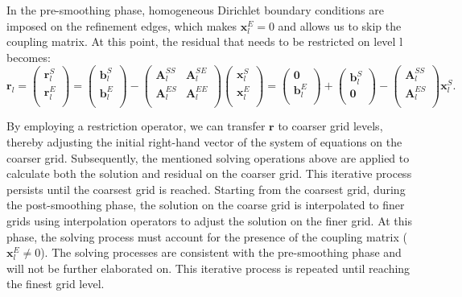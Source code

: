 \documentclass[extra, referee]{gji}
\begin{document}
In the pre-smoothing phase, homogeneous Dirichlet boundary conditions
\citep{BeirodaVeiga2013} are imposed on the refinement edges, which makes
$\mathbf{x}^E_l=0$ and allows us to skip the coupling matrix. At this point, the
residual that needs to be restricted on level l becomes:
\begin{equation}
  \label{eq:ten}
  \mathbf{r}_l=
  \begin{pmatrix}
    \mathbf{r}^S_l\\
    \mathbf{r}^E_l\\
  \end{pmatrix}
  =
  \begin{pmatrix}
    \mathbf{b}^S_l\\
    \mathbf{b}^E_l\\
  \end{pmatrix}
  -
  \begin{pmatrix}
    \mathbf{A}^{SS}_l & \mathbf{A}^{SE}_l\\
    \mathbf{A}^{ES}_l & \mathbf{A}^{EE}_l\\
  \end{pmatrix}
  \begin{pmatrix}
    \mathbf{x}^S_l\\
    \mathbf{x}^E_l\\
  \end{pmatrix}
  =
  \begin{pmatrix}
    \mathbf{0}\\
    \mathbf{b}^E_l\\
  \end{pmatrix}
  +\begin{pmatrix}
    \mathbf{b}^S_l\\
    \mathbf{0}\\
  \end{pmatrix}
  -
  \begin{pmatrix}
    \mathbf{A}^{SS}_l\\
    \mathbf{A}^{ES}_l\\
  \end{pmatrix}
  \mathbf{x}^S_l.
\end{equation}

By employing a restriction operator, we can transfer $\mathbf{r}$ to coarser
grid levels, thereby adjusting the initial right-hand vector of the system of
equations on the coarser grid. Subsequently, the mentioned solving operations
above are applied to calculate both the solution and residual on the coarser
grid. This iterative process persists until the coarsest grid is reached.
Starting from the coarsest grid, during the post-smoothing phase, the solution
on the coarse grid is interpolated to finer grids using interpolation operators
to adjust the solution on the finer grid.  At this phase, the  solving process
must account for the presence of the coupling matrix ($\mathbf{x}^E_l \neq 0$).
The  solving processes are consistent with the pre-smoothing phase and will not
be further elaborated on. This iterative process is repeated until reaching the
finest grid level.
\end{document}
